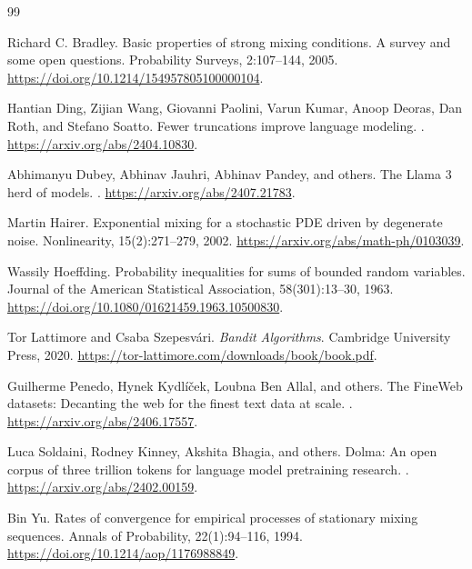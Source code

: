 \documentclass[11pt,twoside]{article}
\theoremstyle{definition}
\theoremstyle{remark}
\begin{document}
\clearpage
\begin{thebibliography}{99}

Richard C. Bradley.
\newblock Basic properties of strong mixing conditions. A survey and some open
questions.
\newblock Probability Surveys, 2:107--144, 2005.
\newblock \url{https://doi.org/10.1214/154957805100000104}.

Hantian Ding, Zijian Wang, Giovanni Paolini, Varun Kumar, Anoop Deoras,
Dan Roth, and Stefano Soatto.
\newblock Fewer truncations improve language modeling.
. \url{https://arxiv.org/abs/2404.10830}.

Abhimanyu Dubey, Abhinav Jauhri, Abhinav Pandey, and others.
\newblock The Llama 3 herd of models.
. \url{https://arxiv.org/abs/2407.21783}.

Martin Hairer.
\newblock Exponential mixing for a stochastic PDE driven by degenerate noise.
\newblock Nonlinearity, 15(2):271--279, 2002.
\newblock \url{https://arxiv.org/abs/math-ph/0103039}.

Wassily Hoeffding.
\newblock Probability inequalities for sums of bounded random variables.
\newblock Journal of the American Statistical Association, 58(301):13--30,
1963. \url{https://doi.org/10.1080/01621459.1963.10500830}.

Tor Lattimore and Csaba Szepesv\'ari.
\newblock \emph{Bandit Algorithms}.
\newblock Cambridge University Press, 2020.
\newblock \url{https://tor-lattimore.com/downloads/book/book.pdf}.

Guilherme Penedo, Hynek Kydl\'i\v{c}ek, Loubna Ben Allal, and others.
\newblock The FineWeb datasets: Decanting the web for the finest text data at
scale.
. \url{https://arxiv.org/abs/2406.17557}.

Luca Soldaini, Rodney Kinney, Akshita Bhagia, and others.
\newblock Dolma: An open corpus of three trillion tokens for language model
pretraining research.
. \url{https://arxiv.org/abs/2402.00159}.

Bin Yu.
\newblock Rates of convergence for empirical processes of stationary mixing
sequences.
\newblock Annals of Probability, 22(1):94--116, 1994.
\newblock \url{https://doi.org/10.1214/aop/1176988849}.

\end{thebibliography}
\end{document}
